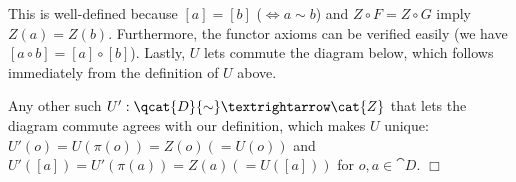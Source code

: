 This is well-defined because $[a] = [b]$ ($⇔ a \sim b$) and $Z ∘ F = Z ∘ G$ imply $Z(a) = Z(b)$. Furthermore, the functor axioms can be verified easily (we have $[a ∘ b] = [a] ∘ [b]$). Lastly, $U$ lets commute the diagram below, which follows immediately from the definition of $U$ above.


Any other such $U' : \qcat{D}{\sim} → \cat{Z}$ that lets the diagram commute agrees with our definition, which makes $U$ unique: $U'(o) = U(π(o)) = Z(o) (= U(o))$ and $U'([a]) = U'(π(a)) = Z(a) (= U([a]))$ for $o, a ∈ \cat{D}$. \hfill $\Box$
